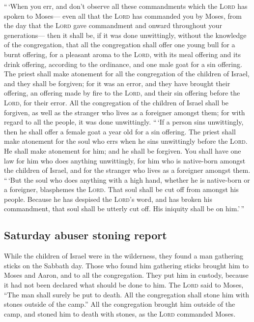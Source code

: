  ``\,`When you err, and don't observe all these
commandments which the \textsc{Lord} has spoken to Moses---
 even all that the \textsc{Lord} has commanded you by
Moses, from the day that the \textsc{Lord} gave commandment and onward
throughout your generations---  then it shall be, if it
was done unwittingly, without the knowledge of the congregation, that
all the congregation shall offer one young bull for a burnt offering,
for a pleasant aroma to the \textsc{Lord}, with its meal offering and
its drink offering, according to the ordinance, and one male goat for a
sin offering.  The priest shall make atonement for all
the congregation of the children of Israel, and they shall be forgiven;
for it was an error, and they have brought their offering, an offering
made by fire to the \textsc{Lord}, and their sin offering before the
\textsc{Lord}, for their error.  All the congregation of
the children of Israel shall be forgiven, as well as the stranger who
lives as a foreigner amongst them; for with regard to all the people, it
was done unwittingly.  ``\,`If a person sins unwittingly,
then he shall offer a female goat a year old for a sin offering.
 The priest shall make atonement for the soul who errs
when he sins unwittingly before the \textsc{Lord}. He shall make
atonement for him; and he shall be forgiven.  You shall
have one law for him who does anything unwittingly, for him who is
native-born amongst the children of Israel, and for the stranger who
lives as a foreigner amongst them.  ``\,`But the soul who
does anything with a high hand, whether he is native-born or a
foreigner, blasphemes the \textsc{Lord}. That soul shall be cut off from
amongst his people.  Because he has despised the
\textsc{Lord}'s word, and has broken his commandment, that soul shall be
utterly cut off. His iniquity shall be on him.'\,''

\hypertarget{saturday-abuser-stoning-report}{%
\subsection{Saturday abuser stoning
report}\label{saturday-abuser-stoning-report}}

 While the children of Israel were in the wilderness,
they found a man gathering sticks on the Sabbath day. 
Those who found him gathering sticks brought him to Moses and Aaron, and
to all the congregation.  They put him in custody,
because it had not been declared what should be done to him.
 The \textsc{Lord} said to Moses, ``The man shall surely
be put to death. All the congregation shall stone him with stones
outside of the camp.''  All the congregation brought him
outside of the camp, and stoned him to death with stones, as the
\textsc{Lord} commanded Moses.

